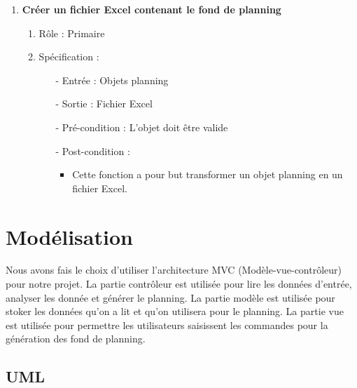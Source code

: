 \documentclass{polytech/polytech}
\begin{document}
\begin{enumerate}
		\item \textbf{Créer un fichier Excel contenant le fond de planning}
		\begin{enumerate}
			\item Rôle :  Primaire
			\item Spécification :
			\begin{itemize}
				\item[-] Entrée : Objets planning
				\item[-] Sortie : Fichier Excel
				\item[-] Pré-condition : L'objet doit être valide
				\item[-] Post-condition :
				\begin{itemize}[label=\textbullet, font=\LARGE]
					\item Cette fonction a pour but transformer un objet planning en un fichier Excel.
				\end{itemize}
			\end{itemize}
		\end{enumerate}
	\end{enumerate}

	\section{Modélisation}

	Nous avons fais le choix d'utiliser l'architecture MVC (Modèle-vue-contrôleur) pour notre projet.
	La partie contrôleur est utilisée pour lire les données d'entrée, analyser les donnée et générer le planning.
	La partie modèle est utilisée pour stoker les données qu'on a lit et qu'on utilisera pour le planning.
	La partie vue est utilisée pour permettre les utilisateurs saisissent les commandes pour la génération des fond de planning.

	\pagebreak

	\subsection{UML}
\end{document}
